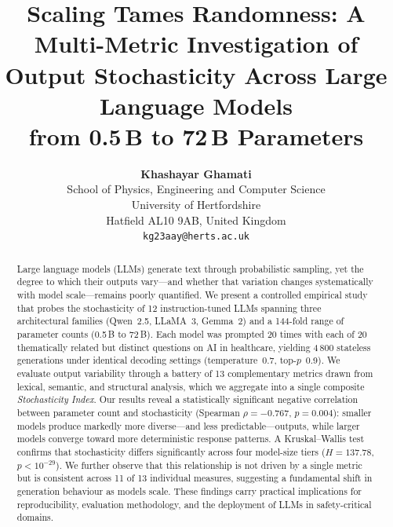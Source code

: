 \documentclass[11pt,a4paper]{article}
\begin{document}
\title{%
    \textbf{Scaling Tames Randomness: A Multi-Metric Investigation of \\
    Output Stochasticity Across Large Language Models \\
    from 0.5\,B to 72\,B Parameters}%
}

\author{
    \textbf{Khashayar Ghamati} \\
    School of Physics, Engineering and Computer Science \\
    University of Hertfordshire \\
    Hatfield AL10 9AB, United Kingdom \\
    \texttt{kg23aay@herts.ac.uk}
}

\date{}

\maketitle

\begin{abstract}
Large language models (LLMs) generate text through probabilistic sampling, yet the degree to which their outputs vary---and whether that variation changes systematically with model scale---remains poorly quantified.
We present a controlled empirical study that probes the stochasticity of 12 instruction-tuned LLMs spanning three architectural families (Qwen~2.5, LLaMA~3, Gemma~2) and a 144-fold range of parameter counts (0.5\,B to 72\,B).
Each model was prompted 20 times with each of 20 thematically related but distinct questions on AI in healthcare, yielding 4\,800 stateless generations under identical decoding settings (temperature~0.7, top-$p$~0.9).
We evaluate output variability through a battery of 13 complementary metrics drawn from lexical, semantic, and structural analysis, which we aggregate into a single composite \emph{Stochasticity Index}.
Our results reveal a statistically significant negative correlation between parameter count and stochasticity (Spearman $\rho = -0.767$, $p = 0.004$): smaller models produce markedly more diverse---and less predictable---outputs, while larger models converge toward more deterministic response patterns.
A Kruskal--Wallis test confirms that stochasticity differs significantly across four model-size tiers ($H = 137.78$, $p < 10^{-29}$).
We further observe that this relationship is not driven by a single metric but is consistent across 11 of 13 individual measures, suggesting a fundamental shift in generation behaviour as models scale.
These findings carry practical implications for reproducibility, evaluation methodology, and the deployment of LLMs in safety-critical domains.
\end{abstract}
\end{document}
